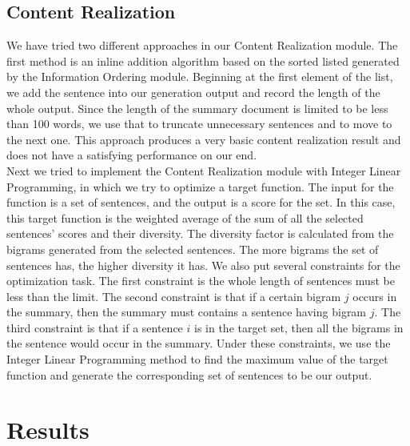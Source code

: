 \documentclass[11pt]{article}
\begin{document}
\subsection{Content Realization}

We have tried two different approaches in our Content Realization module. The first method is an inline addition algorithm based on the sorted listed generated by the Information Ordering module. Beginning at the first element of the list, we add the sentence into our generation output and record the length of the whole output. Since the length of the summary document is limited to be less than 100 words, we use that to truncate unnecessary sentences and to move to the next one. This approach produces a very basic content realization result and does not have a satisfying performance on our end.\\
\indent
Next we tried to implement the Content Realization module with Integer Linear Programming, in which we try to optimize a target function. The input for the function is a set of sentences, and the output is a score for the set. In this case, this target function is the weighted average of the sum of all the selected sentences' scores and their diversity. The diversity factor is calculated from the bigrams generated from the selected sentences. The more bigrams the set of sentences has, the higher diversity it has. We also put several constraints for the optimization task. The first constraint is the whole length of sentences must be less than the limit. The second constraint is that if a certain bigram $j$ occurs in the summary, then the summary must contains a sentence having bigram $j$. The third constraint is that if a sentence $i$ is in the target set, then all the bigrams in the sentence would occur in the summary. Under these constraints, we use the Integer Linear Programming method to find the maximum value of the target function and generate the corresponding set of sentences to be our output.
\section{Results}
\end{document}
